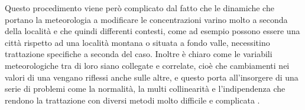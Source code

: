 Questo procedimento viene però complicato dal fatto che le dinamiche che portano la meteorologia a modificare le concentrazioni varino molto a seconda della località e che quindi differenti contesti, come ad esempio possono essere una città rispetto ad una località montana o situata a fondo valle, necessitino trattazione specifiche a seconda del caso. Inoltre è chiaro come le variabili meteorologiche tra di loro siano collegate e correlate, cioè che cambiamenti nei valori di una vengano riflessi anche sulle altre, e questo porta all'insorgere di una serie di problemi come la normalità, la multi collinearità e l'indipendenza che rendono la trattazione con diversi metodi molto difficile e complicata \cite{gunst1975regression}. 

